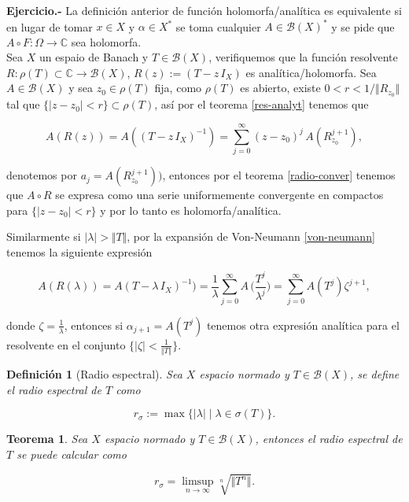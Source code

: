 \documentclass[letterpaper]{report}
\newtheorem{teorema}{Teorema}[chapter]
\newtheorem{def.}{Definici\'on}[chapter]
\newcommand{\co}{\ensuremath{\mathbb C }}
\begin{document}
\noindent\textbf{Ejercicio.-} La definición anterior de función holomorfa/analítica es equivalente si en lugar de tomar $x\in X$ y $\alpha\in X^*$ se toma cualquier $A\in\mathcal{B}(X)^*$ y se pide que $A\circ F:\Omega\rightarrow\co$ sea holomorfa.\\

\noindent Sea $X$ un espaio de Banach y $T\in\mathcal{B}(X)$, verifiquemos que la función resolvente $R:\rho(T)\subset\co\rightarrow\mathcal{B}(X)$, $R(z):=(T-z\,I_X)$ es analítica/holomorfa. Sea $A\in\mathcal{B}(X)$ y sea $z_0\in\rho(T)$ fija, como $\rho(T)$ es abierto, existe \hbox{$0<r<1/\Vert R_{z_0}\Vert$} tal que \hbox{$\lbrace\vert z-z_0\vert<r\rbrace\subset\rho(T)$}, así por el teorema \ref{res-analyt} tenemos que

$$A(R(z))=A((T-z\,I_X)^{-1})=\sum_{j=0}^{\infty}(z-z_0)^j\,A(R_{z_0}^{j+1}),$$

denotemos por $a_j=A(R_{z_0}^{j+1}))$, entonces por el teorema \ref{radio-conver} tenemos que \hbox{$A\circ R$} se expresa como una serie uniformemente convergente en compactos para \hbox{$\lbrace\vert z-z_0\vert<r\rbrace$} y por lo tanto es holomorfa/analítica.

Similarmente si $\vert\lambda\vert>\Vert T\Vert$, por la expansión de Von-Neumann \ref{von-neumann} tenemos la siguiente expresión

$$
A(R(\lambda))=A(T-\lambda\,I_X)^{-1})=
\frac{1}{\lambda}\sum_{j=0}^{\infty}A\,\Big(\frac{T^j}{\lambda^j}\Big)=
\sum_{j=0}^{\infty}A(T^j)\zeta^{j+1},
$$

donde $\zeta=\frac{1}{\lambda}$, entonces si $\alpha_{j+1}=A(T^j)$ tenemos otra expresión analítica para el resolvente en el conjunto \hbox{$\lbrace\vert\zeta\vert<\frac{1}{\Vert T\Vert}\rbrace$}.

\begin{def.}[Radio espectral]
Sea $X$ espacio normado y $T\in\mathcal{B}(X)$, se define el radio espectral de $T$ como

\begin{equation}
r_{\sigma}:=\max\lbrace\vert\lambda\vert\mid\lambda\in\sigma(T)\rbrace.
\end{equation}
\end{def.}

\begin{teorema}
Sea $X$ espacio normado y $T\in\mathcal{B}(X)$, entonces el radio espectral de $T$ se puede calcular como

\begin{equation}
r_{\sigma}=\limsup_{n\rightarrow\infty}\sqrt[n]{\Vert T^n\Vert}. 
\end{equation}
\end{teorema}
\end{document}
